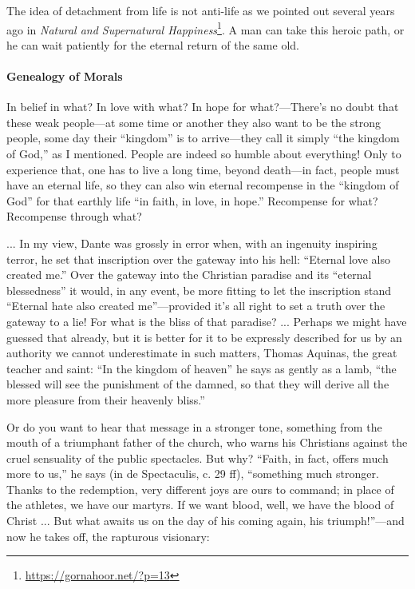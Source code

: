 The idea of detachment from life is not anti-life as we pointed out several years ago in \textit{Natural and Supernatural Happiness}\footnote{\url{https://gornahoor.net/?p=13}}. A man can take this heroic path, or he can wait patiently for the eternal return of the same old.

\paragraph{Genealogy of Morals}


\begin{quotationx}
In belief in what? In love with what? In hope for what?---There's no doubt that these weak people---at some time or another they also want to be the strong people, some day their ``kingdom'' is to arrive---they call it simply ``the kingdom of God,'' as I mentioned. People are indeed so humble about everything! Only to experience that, one has to live a long time, beyond death---in fact, people must have an eternal life, so they can also win eternal recompense in the ``kingdom of God'' for that earthly life ``in faith, in love, in hope.'' Recompense for what? Recompense through what?

... In my view, Dante was grossly in error when, with an ingenuity inspiring terror, he set that inscription over the gateway into his hell: ``Eternal love also created me.'' Over the gateway into the Christian paradise and its ``eternal blessedness'' it would, in any event, be more fitting to let the inscription stand ``Eternal hate also created me''---provided it's all right to set a truth over the gateway to a lie! For what is the bliss of that paradise? ... Perhaps we might have guessed that already, but it is better for it to be expressly described for us by an authority we cannot underestimate in such matters, Thomas Aquinas, the great teacher and saint: ``In the kingdom of heaven'' he says as gently as a lamb, ``the blessed will see the punishment of the damned, so that they will derive all the more pleasure from their heavenly bliss.''

Or do you want to hear that message in a stronger tone, something from the mouth of a triumphant father of the church, who warns his Christians against the cruel sensuality of the public spectacles. But why? ``Faith, in fact, offers much more to us,'' he says (in de Spectaculis, c. 29 ff), ``something much stronger. Thanks to the redemption, very different joys are ours to command; in place of the athletes, we have our martyrs. If we want blood, well, we have the blood of Christ ... But what awaits us on the day of his coming again, his triumph!''---and now he takes off, the rapturous visionary:


\end{quotationx}
